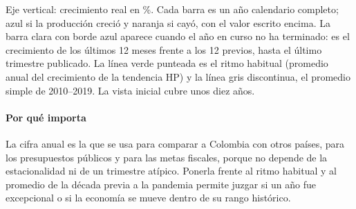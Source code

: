 \begin{leer}
Eje vertical: crecimiento real en \%. Cada barra es un año calendario completo; azul si la producción creció y naranja si cayó, con el valor escrito encima. La barra clara con borde azul aparece cuando el año en curso no ha terminado: es el crecimiento de los últimos 12 meses frente a los 12 previos, hasta el último trimestre publicado. La línea verde punteada es el ritmo habitual (promedio anual del crecimiento de la tendencia HP) y la línea gris discontinua, el promedio simple de 2010–2019. La vista inicial cubre unos diez años.
\end{leer}

\paragraph{Por qué importa}
La cifra anual es la que se usa para comparar a Colombia con otros países, para los presupuestos públicos y para las metas fiscales, porque no depende de la estacionalidad ni de un trimestre atípico. Ponerla frente al ritmo habitual y al promedio de la década previa a la pandemia permite juzgar si un año fue excepcional o si la economía se mueve dentro de su rango histórico.

